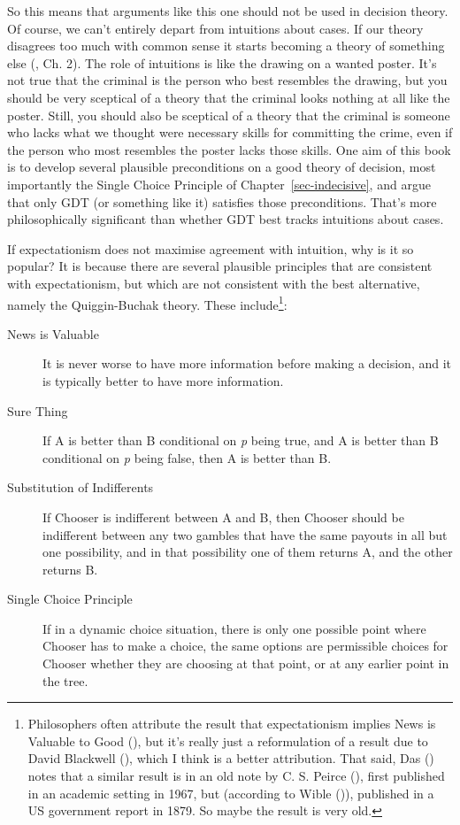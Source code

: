 \documentclass[
  12pt,
  letterpaper,
  DIV=11,
  numbers=noendperiod]{scrreprt}
\begin{document}
So this means that arguments like this one should not be used in
decision theory. Of course, we can't entirely depart from intuitions
about cases. If our theory disagrees too much with common sense it
starts becoming a theory of something else
(, Ch. 2). The role of
intuitions is like the drawing on a wanted poster. It's not true that
the criminal is the person who best resembles the drawing, but you
should be very sceptical of a theory that the criminal looks nothing at
all like the poster. Still, you should also be sceptical of a theory
that the criminal is someone who lacks what we thought were necessary
skills for committing the crime, even if the person who most resembles
the poster lacks those skills. One aim of this book is to develop
several plausible preconditions on a good theory of decision, most
importantly the Single Choice Principle of Chapter~\ref{sec-indecisive},
and argue that only GDT (or something like it) satisfies those
preconditions. That's more philosophically significant than whether GDT
best tracks intuitions about cases.

If expectationism does not maximise agreement with intuition, why is it
so popular? It is because there are several plausible principles that
are consistent with expectationism, but which are not consistent with
the best alternative, namely the Quiggin-Buchak theory. These
include\footnote{Philosophers often attribute the result that
  expectationism implies News is Valuable to Good
  (), but it's really just a reformulation
  of a result due to David Blackwell
  (), which I think is a better
  attribution. That said, Das () notes that
  a similar result is in an old note by C. S. Peirce
  (), first published in an academic
  setting in 1967, but (according to Wible
  ()), published in a US government report
  in 1879. So maybe the result is very old.}:

\begin{description}
\item[News is Valuable]
It is never worse to have more information before making a decision, and
it is typically better to have more information.
\item[Sure Thing]
If A is better than B conditional on \emph{p} being true, and A is
better than B conditional on \emph{p} being false, then A is better than
B.
\item[Substitution of Indifferents]
If Chooser is indifferent between A and B, then Chooser should be
indifferent between any two gambles that have the same payouts in all
but one possibility, and in that possibility one of them returns A, and
the other returns B.
\item[Single Choice Principle]
If in a dynamic choice situation, there is only one possible point where
Chooser has to make a choice, the same options are permissible choices
for Chooser whether they are choosing at that point, or at any earlier
point in the tree.
\end{description}
\end{document}
